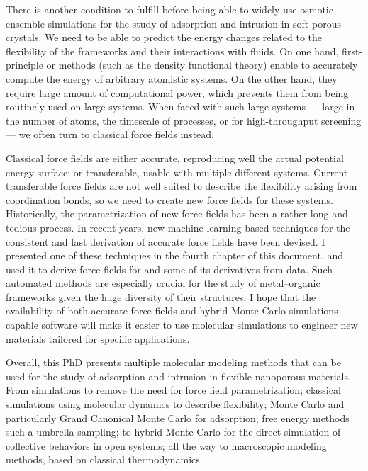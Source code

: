 There is another condition to fulfill before being able to widely use osmotic
ensemble simulations for the study of adsorption and intrusion in soft porous
crystals. We need to be able to predict the energy changes related to the
flexibility of the frameworks and their interactions with fluids. On one hand,
first-principle or \abinitio methods (such as the density functional theory)
enable to accurately compute the energy of arbitrary atomistic systems. On the
other hand, they require large amount of computational power, which prevents
them from being routinely used on large systems. When faced with such large
systems --- large in the number of atoms, the timescale of processes, or for
high-throughput screening --- we often turn to classical force fields instead.

Classical force fields are either accurate, \ie reproducing well the actual
potential energy surface; or transferable, \ie usable with multiple different
systems. Current transferable force fields are not well suited to describe the
flexibility arising from coordination bonds, so we need to create new force
fields for these systems. Historically, the parametrization of new force fields
has been a rather long and tedious process. In recent years, new machine
learning-based techniques for the consistent and fast derivation of accurate
force fields have been devised. I presented one of these techniques in the
fourth chapter of this document, and used it to derive force fields for 
and some of its derivatives from \abinitio data. Such automated methods are
especially crucial for the study of metal--organic frameworks given the huge
diversity of their structures. I hope that the availability of both accurate
force fields and hybrid Monte Carlo simulations capable software will make it
easier to use molecular simulations to engineer new materials tailored for
specific applications.

Overall, this PhD presents multiple molecular modeling methods that can be used
for the study of adsorption and intrusion in flexible nanoporous materials. From
\abinitio simulations to remove the need for force field parametrization;
classical simulations using molecular dynamics to describe flexibility; Monte
Carlo and particularly Grand Canonical Monte Carlo for adsorption; free energy
methods such a umbrella sampling; to hybrid Monte Carlo for the direct
simulation of collective behaviors in open systems; all the way to macroscopic
modeling methods, based on classical thermodynamics.

\begin{center}
\end{center}

